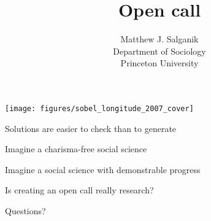 \documentclass[aspectratio=169]{beamer}
\title[]{Open call}
\author[]{Matthew J. Salganik\\Department of Sociology\\Princeton University}
\date[]{Summer Institute in Computational Social Science\\June 22, 2018
\vfill
\begin{flushleft}
{\scriptsize
The Summer Institute in Computational Social Science is supported by grants from the Russell Sage Foundation and the Alfred P. Sloan Foundation.}
\end{flushleft}
\begin{flushright}
\texttt{[image: figures/cc-by.png]}
\end{flushright}
}
\begin{document}
\frame{\titlepage}
\begin{frame}

\begin{center}
\texttt{[image: figures/sobel\_longitude\_2007\_cover]}
\end{center}

\end{frame}
\begin{frame}

{\Large
\begin{center}
Solutions are easier to check than to generate
\end{center}
}

\end{frame}
\begin{frame}

{\Large
\begin{center}
Imagine a charisma-free social science
\end{center}
}

\end{frame}
\begin{frame}

{\Large
\begin{center}
Imagine a social science with demonstrable progress
\end{center}
}

\end{frame}
\begin{frame}

{\Large
\begin{center}
Is creating an open call really research?
\end{center}
}

\end{frame}
\begin{frame}

{\Large
\begin{center}
Questions? 
\end{center}
}

\end{frame}
\end{document}
